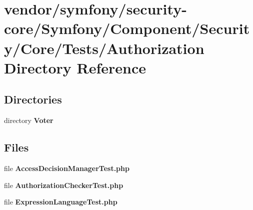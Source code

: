 \section{vendor/symfony/security-\/core/\+Symfony/\+Component/\+Security/\+Core/\+Tests/\+Authorization Directory Reference}
\label{dir_834ff13b1f19cb91eb62199cc42b1266}
\subsection*{Directories}
\begin{DoxyCompactItemize}
\item 
directory {\bf Voter}
\end{DoxyCompactItemize}
\subsection*{Files}
\begin{DoxyCompactItemize}
\item 
file {\bf Access\+Decision\+Manager\+Test.\+php}
\item 
file {\bf Authorization\+Checker\+Test.\+php}
\item 
file {\bf Expression\+Language\+Test.\+php}
\end{DoxyCompactItemize}
